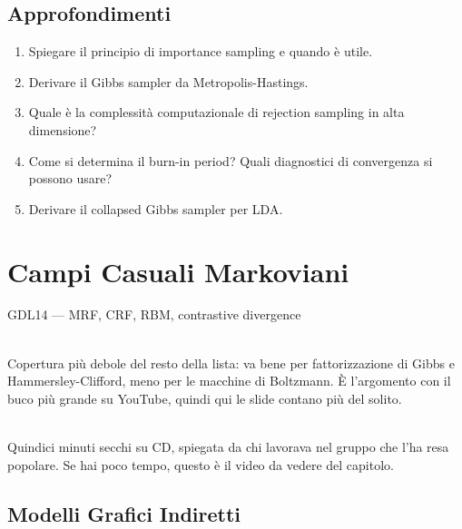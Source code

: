 \section{Approfondimenti}

\begin{tcolorbox}[title=Domande d'Esame]
  \begin{enumerate}
    \item Spiegare il principio di importance sampling e quando è utile.
    \item Derivare il Gibbs sampler da Metropolis-Hastings.
    \item Quale è la complessità computazionale di rejection sampling in alta dimensione?
    \item Come si determina il burn-in period? Quali diagnostici di convergenza si possono usare?
    \item Derivare il collapsed Gibbs sampler per LDA.
  \end{enumerate}
\end{tcolorbox}

\chapter{Campi Casuali Markoviani}\label{ch:mrf}

\begin{risorsevideo}{GDL14 — MRF, CRF, RBM, contrastive divergence}

\medskip
{}\\
Copertura più debole del resto della lista: va bene per fattorizzazione di Gibbs e Hammersley-Clifford, meno per le macchine di Boltzmann. È l'argomento con il buco più grande su YouTube, quindi qui le slide contano più del solito.

\medskip
{}\\
Quindici minuti secchi su CD, spiegata da chi lavorava nel gruppo che l'ha resa popolare. Se hai poco tempo, questo è il video da vedere del capitolo.
\end{risorsevideo}

\section{Modelli Grafici Indiretti}

